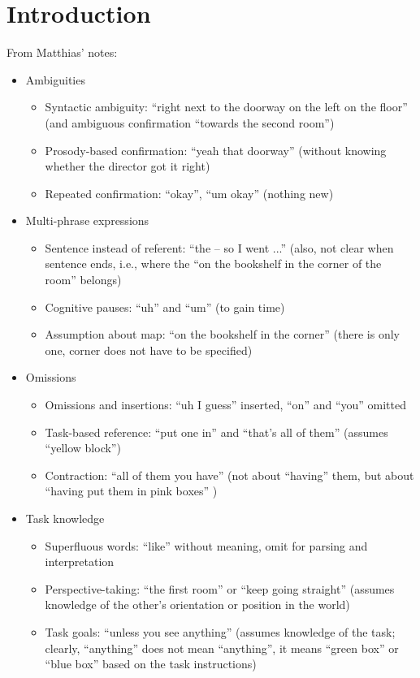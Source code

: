 \documentclass[12pt]{article}
\begin{document}
\section{Introduction}
From Matthias' notes:
\begin{itemize}
\item Ambiguities
  \begin{itemize}
  \item Syntactic ambiguity: “right next to the doorway on the left on the floor” (and ambiguous confirmation “towards the second room”)
  \item Prosody-based confirmation: “yeah that doorway” (without knowing whether the director got it right)
  \item Repeated confirmation: “okay”, “um okay” (nothing new)
  \end{itemize}
\item Multi-phrase expressions
  \begin{itemize}
  \item Sentence instead of referent: “the – so I went ...” (also, not
    clear when sentence ends, i.e., where the “on the bookshelf in the
    corner of the room” belongs)
  \item Cognitive pauses: “uh” and “um” (to gain time)
  \item Assumption about map: “on the bookshelf in the corner” (there
    is only one, corner does not have to be specified)
  \end{itemize}
\item Omissions
  \begin{itemize}
  \item Omissions and insertions: “uh I guess” inserted, “on” and
    “you” omitted
  \item Task-based reference: “put one in” and “that's all of them”
    (assumes “yellow block”)
  \item Contraction: “all of them you have” (not about “having” them,
    but about “having put them in pink boxes” )
  \end{itemize}
\item Task knowledge
  \begin{itemize}
  \item Superfluous words: “like” without meaning, omit for parsing and interpretation
  \item Perspective-taking: “the first room” or “keep going straight” (assumes knowledge of the other's orientation or position in the world)
  \item Task goals: “unless you see anything” (assumes knowledge of the task; clearly, “anything” does not mean “anything”, it means “green box” or “blue box” based on the task instructions)
  \end{itemize}
\end{itemize}
\end{document}
